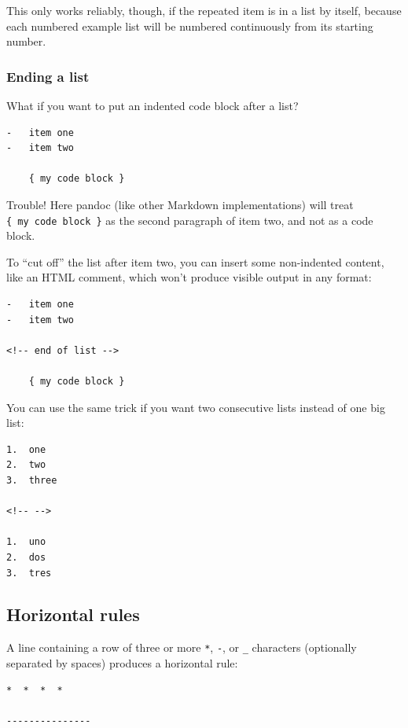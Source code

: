 \documentclass[
]{article}
\begin{document}
This only works reliably, though, if the repeated item is in a list by
itself, because each numbered example list will be numbered continuously
from its starting number.

\hypertarget{ending-a-list}{%
\subsubsection{Ending a list}\label{ending-a-list}}

What if you want to put an indented code block after a list?

\begin{verbatim}
-   item one
-   item two

    { my code block }
\end{verbatim}

Trouble! Here pandoc (like other Markdown implementations) will treat
\texttt{\{\ my\ code\ block\ \}} as the second paragraph of item two,
and not as a code block.

To ``cut off'' the list after item two, you can insert some non-indented
content, like an HTML comment, which won't produce visible output in any
format:

\begin{verbatim}
-   item one
-   item two

<!-- end of list -->

    { my code block }
\end{verbatim}

You can use the same trick if you want two consecutive lists instead of
one big list:

\begin{verbatim}
1.  one
2.  two
3.  three

<!-- -->

1.  uno
2.  dos
3.  tres
\end{verbatim}

\hypertarget{horizontal-rules}{%
\subsection{Horizontal rules}\label{horizontal-rules}}

A line containing a row of three or more \texttt{*}, \texttt{-}, or
\texttt{\_} characters (optionally separated by spaces) produces a
horizontal rule:

\begin{verbatim}
*  *  *  *

---------------
\end{verbatim}
\end{document}
